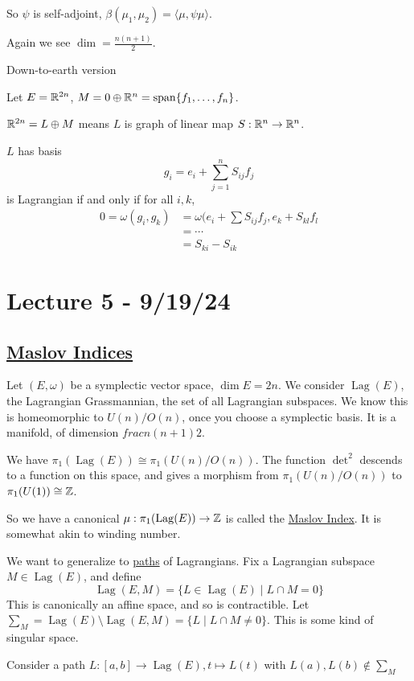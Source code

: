 \documentclass[x11names,reqno,14pt]{extarticle}
\DeclareMathOperator{\Lag}{Lag}
\DeclareMathOperator{\Span}{span}
\begin{document}
So $\psi$ is self-adjoint, $\beta(\mu_1,\mu_2) = \langle \mu, \psi \mu \rangle$. 

Again we see $\dim = \frac{n(n + 1)}{2}$.

Down-to-earth version

Let $E = \mathbb{R}^{2n}$, $M = 0\oplus\R^n = \Span\{f_1, \dots, f_n\}$. 

$\mathbb{R}^{2n} = L\oplus M$ means $L$ is graph of linear map $S: \mathbb{R}^n\to\mathbb{R}^n$.

$L$ has basis 
\[
g_i = e_i + \sum_{j=1}^n S_{ij}f_j
\]
is Lagrangian if and only if for all $i, k$, 
\begin{align*}
0 = \omega(g_i, g_k) & = \omega(e_i + \sum S_{ij}f_j, e_k + S_{kl}f_l \\
& = \cdots \\
& = S_{ki} - S_{ik}
\end{align*}

\section*{Lecture 5 - 9/19/24}

\subsection*{\underline{Maslov Indices}}

Let $(E,\omega)$ be a symplectic vector space, $\dim E = 2n$. We consider $\Lag(E)$, the Lagrangian Grassmannian, the set of all Lagrangian subspaces. We know this is homeomorphic to $U(n)/O(n)$, once you choose a symplectic basis. It is a manifold, of dimension $frac{n(n+1)}{2}$. 

We have $\pi_1(\Lag(E)) \cong \pi_1(U(n)/O(n))$. The function $\det^2$ descends to a function on this space, and gives a morphism from $\pi_1(U(n)/O(n))$ to $\pi_1(U(1)) \cong \mathbb{Z}$. 

So we have a canonical $\mu:\pi_1(\Lag(E)) \to \Z$ is called the \underline{Maslov Index}. It is somewhat akin to winding number. 

We want to generalize to \underline{paths} of Lagrangians. Fix a Lagrangian subspace $M\in\Lag(E)$, and define
\[
\Lag(E,M) = \{L\in \Lag(E) \mid L \cap M = 0 \}
\]
This is canonically an affine space, and so is contractible. Let $\sum_M = \Lag(E) \setminus \Lag(E,M) = \{L \mid L \cap M \neq 0\}$. This is some kind of singular space. 

Consider a path $L:[a, b] \to \Lag(E), t \mapsto L(t)$ with $L(a), L(b) \not\in\sum_M$
\end{document}
